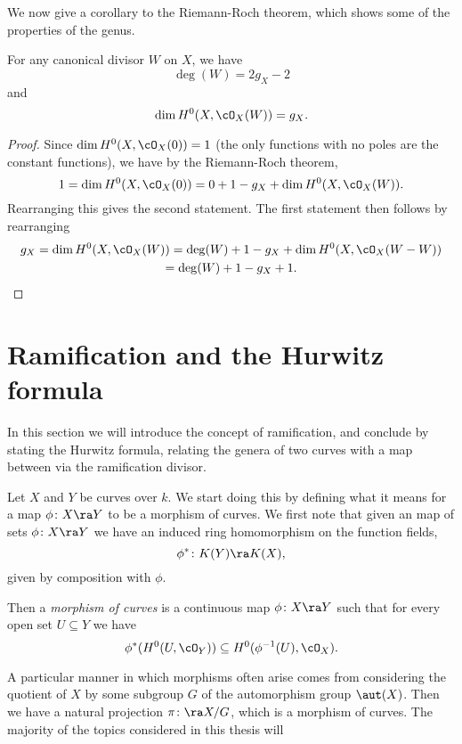 We now give a corollary to the Riemann-Roch theorem, which shows some of the properties of the genus.

    \begin{cor}\label{dim=gc}
    For any canonical divisor $W$ on $X$, we have 
        \[
        \deg(W) = 2g_X-2
        \]
    and 
        \[
        \dim H^0(X,\cO_X(W)) = g_X.
        \]
    \end{cor}
    \begin{proof}
    Since $\dim H^0(X,\cO_X(0)) = 1$ (the only functions with no poles are the constant functions), we have by the Riemann-Roch theorem, 
        \[
        1= \dim H^0(X,\cO_X(0)) = 0 + 1 -g_X + \dim H^0(X,\cO_X(W)).
        \]
    Rearranging this gives the second statement.
    The first statement then follows by rearranging
        \begin{multline*}
        g_X = \dim H^0(X,\cO_X(W)) = \deg(W) + 1 -g_X +  \dim H^0(X,\cO_X(W-W))\\ = \deg(W) + 1 -g_X + 1.
        \end{multline*}
    \end{proof}

\section{Ramification and the Hurwitz formula}

In this section we will introduce the concept of ramification, and conclude by stating the Hurwitz formula, relating the genera of two curves with a map between via the ramification divisor.



Let $X$ and $Y$ be curves over $k$.
We start doing this by defining what it means for a map $\phi \colon X \ra Y$ to be a morphism of curves.
We first note that given an map of sets $\phi \colon X \ra Y$ we have an induced ring homomorphism on the function fields,
    \[
    \phi^* \colon K(Y) \ra K(X),
    \]
given by composition with $\phi$.

Then a \emph{morphism of curves} is a continuous map $\phi \colon X \ra Y$ such that for every open set $U \subseteq Y$ we have
    \[
    \phi^*(H^0(U,\cO_Y)) \subseteq H^0(\phi^{-1}(U),\cO_X).
    \]

A particular manner in which morphisms often arise comes from considering the quotient of $X$ by some subgroup $G$ of the automorphism group $\aut(X)$.
Then we have a natural projection $\pi \colon \ra X/G$, which is a morphism of curves.
The majority of the topics considered in this thesis will 






















